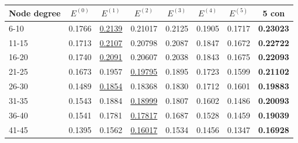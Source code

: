 \begin{table*}[]
    \centering
    \begin{tabular}{|l|l|l|l|l|l|l||l|}
        \hline
        Node degree & \multicolumn{1}{c|}{$E^{(0)}$} & \multicolumn{1}{c|}{$E^{(1)}$} & \multicolumn{1}{c|}{$E^{(2)}$} & \multicolumn{1}{c|}{$E^{(3)}$} & \multicolumn{1}{c|}{$E^{(4)}$} & \multicolumn{1}{c||}{$E^{(5)}$} & \multicolumn{1}{c|}{5 con} \\ \hline
        6-10        & 0.1766                         & \underline{0.2139}             & 0.21017                        & 0.2125                         & 0.1905                         & 0.1717                          & \textbf{0.23023}           \\ \hline
        11-15       & 0.1713                         & \underline{0.2107}             & 0.20798                        & 0.2087                         & 0.1847                         & 0.1672                          & \textbf{0.22722}           \\ \hline
        16-20       & 0.1740                         & \underline{0.2091}             & 0.20607                        & 0.2038                         & 0.1843                         & 0.1675                          & \textbf{0.22093}           \\ \hline
        21-25       & 0.1673                         & 0.1957                         & \underline{0.19795}            & 0.1895                         & 0.1723                         & 0.1599                          & \textbf{0.21102}           \\ \hline
        26-30       & 0.1489                         & \underline{0.1854}             & 0.18368                        & 0.1830                         & 0.1712                         & 0.1601                          & \textbf{0.19883}           \\ \hline
        31-35       & 0.1543                         & 0.1884                         & \underline{0.18999}            & 0.1807                         & 0.1602                         & 0.1486                          & \textbf{0.20093}           \\ \hline
        36-40       & 0.1541                         & 0.1781                         & \underline{0.17817}            & 0.1687                         & 0.1528                         & 0.1459                          & \textbf{0.19039}           \\ \hline
        41-45       & 0.1395                         & 0.1562                         & \underline{0.16017}            & 0.1534                         & 0.1456                         & 0.1347                          & \textbf{0.16928}           \\ \hline

\end{tabular}
\end{table*}

